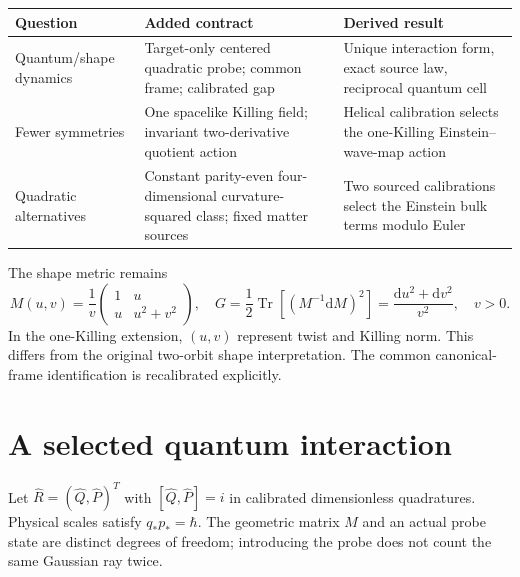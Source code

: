 \documentclass[11pt]{article}
\newcommand{\Tr}{\operatorname{Tr}}\newcommand{\dd}{\mathrm d}
\begin{document}
\begin{center}\small
\begin{tabular}{@{}>{\raggedright\arraybackslash}p{}>{\raggedright\arraybackslash}p{}>{\raggedright\arraybackslash}p{}@{}}
\toprule
Question & Added contract & Derived result\\\midrule
Quantum/shape dynamics & Target-only centered quadratic probe; common frame; calibrated gap & Unique interaction form, exact source law, reciprocal quantum cell\\
Fewer symmetries & One spacelike Killing field; invariant two-derivative quotient action & Helical calibration selects the one-Killing Einstein--wave-map action\\
Quadratic alternatives & Constant parity-even four-dimensional curvature-squared class; fixed matter sources & Two sourced calibrations select the Einstein bulk terms modulo Euler\\\bottomrule
\end{tabular}
\end{center}

The shape metric remains
\begin{equation}\label{eq:target}
M(u,v)=\frac1v\begin{pmatrix}1&u\\u&u^2+v^2\end{pmatrix},\quad
G=\frac12\Tr[(M^{-1}\dd M)^2]=\frac{\dd u^2+\dd v^2}{v^2},\quad v>0.
\end{equation}
In the one-Killing extension, $(u,v)$ represent twist and Killing norm. This differs from the original two-orbit shape interpretation. The common canonical-frame identification is recalibrated explicitly.

\section{A selected quantum interaction}
Let $\widehat R=(\widehat Q,\widehat P)^T$ with $[\widehat Q,\widehat P]=i$ in calibrated dimensionless quadratures. Physical scales satisfy $q_*p_*=\hbar$. The geometric matrix $M$ and an actual probe state are distinct degrees of freedom; introducing the probe does not count the same Gaussian ray twice.
\end{document}
